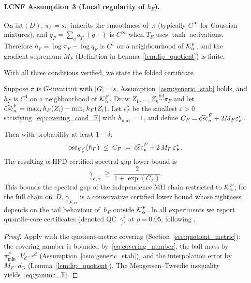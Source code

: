 \paragraph{LCNF Assumption~3 (Local regularity of $h_F$).}
On $\mathrm{int}(D)$, $\pi_F = s\pi$ inherits the smoothness
of~$\pi$ (typically $C^\infty$ for Gaussian mixtures), and
$q_F = \sum_g q_{T_F}(g\,\cdot\,)$ is $C^\infty$ when $T_F$
uses $\tanh$ activations.  Therefore $h_F = \log\pi_F - \log q_F$
is $C^1$ on a neighbourhood of $\mathcal{K}_\alpha^F$, and the gradient
supremum $M_F$ (Definition in Lemma~\ref{lem:lip_quotient}) is
finite.

\medskip
With all three conditions verified, we state the folded certificate.

\begin{theorem}\label{thm:folded_cert}
  Suppose $\pi$ is $G$-invariant with $|G| = s$,
  Assumption~\ref{asm:generic_stab} holds, and $h_F$ is $C^1$ on a
  neighbourhood of $\mathcal{K}_\alpha^F$.
  Draw $Z_1, \ldots, Z_n \overset{\mathrm{iid}}{\sim} \pi_F$ and
  let $\widehat{\mathrm{osc}}_n^F = \max_i h_F(Z_i) - \min_i h_F(Z_i)$.
  Let $\varepsilon_F^*$ be the smallest $\varepsilon > 0$
  satisfying~\eqref{eq:covering_cond_F} with $h_{\max} = 1$, and
  define $C_F = \widehat{\mathrm{osc}}_n^F + 2 M_F \varepsilon_F^*$.

  Then with probability at least $1 - \delta$:
  \begin{equation}\label{eq:osc_bound_F}
    \mathrm{osc}_{\mathcal{K}_\alpha^F}(h_F)
    \;\leq\; C_F
    \;=\; \widehat{\mathrm{osc}}_n^F + 2\,M_F\,\varepsilon_F^*.
  \end{equation}
  The resulting $\alpha$-HPD certified spectral-gap lower bound is
  \begin{equation}\label{eq:gamma_F}
    \underline{\gamma}_{F,\alpha}
    \;\geq\; \frac{2}{1 + \exp(C_F)}.
  \end{equation}
  This bounds the spectral gap of the independence MH chain
  restricted to $\mathcal{K}_\alpha^F$; for the full chain on~$D$,
  $\underline{\gamma}_{F,\alpha}$ is a conservative certified lower
  bound whose tightness depends on the tail behaviour of~$h_F$
  outside $\mathcal{K}_\alpha^F$.  In all experiments we report
  quantile-core certificates (denoted
  QC~$\underline{\gamma}$) at $\rho = 0.05$, following
  \citet{CerTMCMC}.
\end{theorem}

\begin{proof}
  Apply \citet[Theorem~5.1]{LCNF} with the quotient-metric covering
  (Section~\ref{sec:quotient_metric}): the covering
  number is bounded by~\eqref{eq:covering_number}, the ball mass by
  $\pi_{\min}^F \cdot V_d \cdot \varepsilon^d$
  (Assumption~\ref{asm:generic_stab}), and the interpolation error by
  $M_F \cdot d_G$ (Lemma~\ref{lem:lip_quotient}).
  The Mengersen--Tweedie inequality
  \citep{MengersenTweedie1996} yields~\eqref{eq:gamma_F}.
\end{proof}


